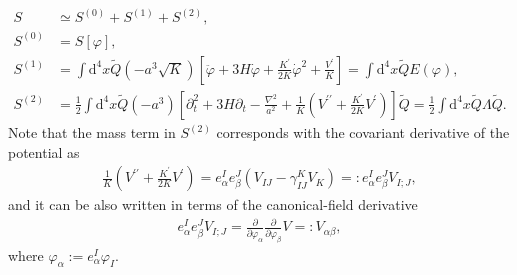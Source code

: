 \documentclass[aps, prd
, preprint
, nofootinbib 
]{revtex4-1}
\newcommand{\pdif}[2]{\frac{\partial #1}{\partial #2}}
\newcommand{\dd}{\mathrm{d}}
\newcommand{\bae}[1]{\begin{align} #1 \end{align}}
\begin{document}
\bae{
	S&\simeq S^{(0)}+S^{(1)}+S^{(2)}, \nonumber \\
	S^{(0)}&=S[\varphi], \\
	S^{(1)}&=\int\dd^4x\tilde{Q}(-a^3\sqrt{K})\left[\ddot{\varphi}+3H\dot{\varphi}+\frac{K^\prime}{2K}\dot{\varphi}^2+\frac{V^\prime}{K}\right]
	=\int\dd^4x\tilde{Q}E(\varphi), \\
	S^{(2)}&=\frac{1}{2}\int\dd^4x\tilde{Q}(-a^3)\left[\partial_t^2+3H\partial_t-\frac{\nabla^2}{a^2}+\frac{1}{K}\left(V^{\prime\prime}
	+\frac{K^\prime}{2K}V^\prime\right)\right]\tilde{Q}
	=\frac{1}{2}\int\dd^4x\tilde{Q}\Lambda\tilde{Q}.
}
Note that the mass term in $S^{(2)}$ corresponds with the covariant derivative of the potential as
\bae{
	\frac{1}{K}\left(V^{\prime\prime}+\frac{K^\prime}{2K}V^\prime\right)=e^I_\alpha e^J_\beta\left(V_{IJ}-\gamma^K_{IJ}V_K\right)
	=:e^I_\alpha e^J_\beta V_{I;J},
}
and it can be also written in terms of the canonical-field derivative
\bae{\label{eq: Vab}
	e^I_\alpha e^J_\beta V_{I;J}=\pdif{}{\varphi_\alpha}\pdif{}{\varphi_\beta}V=:V_{\alpha\beta},
}
where $\varphi_\alpha:=e^I_\alpha\varphi_I$.
\end{document}
